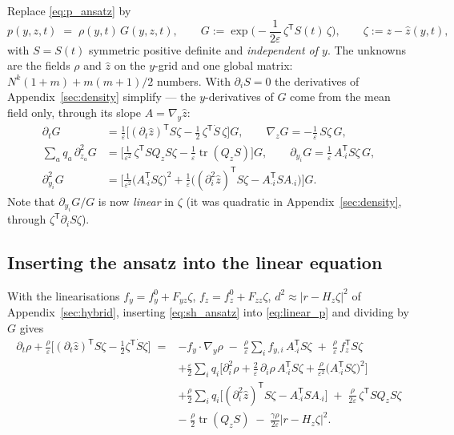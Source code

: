 \documentclass[11pt,a4paper]{article}
\newcommand{\tr}{\operatorname{tr}}
\newcommand{\T}{^{\mathsf T}}
\newcommand{\zh}{\hat{z}}
\newcommand{\eps}{\varepsilon}
\newcommand{\abs}[1]{\left\lvert #1 \right\rvert}
\newcommand{\gy}{\nabla_{\!y}}
\newcommand{\gz}{\nabla_{\!z}}
\theoremstyle{plain}
\theoremstyle{definition}
\theoremstyle{remark}
\begin{document}
Replace \eqref{eq:p_ansatz} by
\begin{equation}
  p(y,z,t) \;=\; \rho(y,t)\,G(y,z,t), \qquad
  G := \exp\Big(-\frac{1}{2\eps}\,\zeta\T S(t)\,\zeta\Big), \qquad \zeta := z-\zh(y,t),
  \label{eq:sh_ansatz}
\end{equation}
with $S=S(t)$ symmetric positive definite and \emph{independent of $y$}. The unknowns are the fields $\rho$ and $\zh$ on the $y$-grid and one global matrix: $N^k(1+m) + m(m+1)/2$ numbers. With $\partial_iS=0$ the derivatives of Appendix~\ref{sec:density} simplify --- the $y$-derivatives of $G$ come from the mean field only, through its slope $A=\gy\zh$:
\begin{align*}
  \partial_tG &= \frac1\eps\Big[(\partial_t\zh)\T S\zeta - \tfrac12\,\zeta\T\dot S\,\zeta\Big]G, \qquad
  \gz G = -\frac1\eps\,S\zeta\,G, \\
  \sum_a q_a\,\partial_{z_a}^2G &= \Big[\frac1{\eps^2}\,\zeta\T SQ_zS\zeta - \frac1\eps\tr(Q_zS)\Big]G, \qquad
  \partial_{y_i}G = \frac1\eps\,A_{\cdot i}\T S\zeta\,G, \\
  \partial_{y_i}^2G &= \Big[\frac1{\eps^2}\big(A_{\cdot i}\T S\zeta\big)^2 + \frac1\eps\Big((\partial_i^2\zh)\T S\zeta - A_{\cdot i}\T SA_{\cdot i}\Big)\Big]G .
\end{align*}
Note that $\partial_{y_i}G/G$ is now \emph{linear} in $\zeta$ (it was quadratic in Appendix~\ref{sec:density}, through $\zeta\T\partial_iS\zeta$).

\subsection{Inserting the ansatz into the linear equation}

With the linearisations $f_y = f_y^0+F_{yz}\zeta$, $f_z = f_z^0+F_{zz}\zeta$, $d^2\approx\abs{r-H_z\zeta}^2$ of Appendix~\ref{sec:hybrid}, inserting \eqref{eq:sh_ansatz} into \eqref{eq:linear_p} and dividing by $G$ gives
\begin{equation}
\begin{aligned}
  \partial_t\rho + \frac\rho\eps\Big[(\partial_t\zh)\T S\zeta - \tfrac12\zeta\T\dot S\zeta\Big]
  \;={}& -f_y\cdot\gy\rho \;-\; \frac\rho\eps\sum_i f_{y,i}\,A_{\cdot i}\T S\zeta \;+\; \frac\rho\eps\,f_z\T S\zeta \\
  &+ \frac\eps2\sum_iq_i\Big[\partial_i^2\rho + \frac2\eps\,\partial_i\rho\,A_{\cdot i}\T S\zeta
     + \frac\rho{\eps^2}\big(A_{\cdot i}\T S\zeta\big)^2\Big] \\
  &+ \frac\rho2\sum_iq_i\Big[(\partial_i^2\zh)\T S\zeta - A_{\cdot i}\T SA_{\cdot i}\Big]
  \;+\; \frac\rho{2\eps}\,\zeta\T SQ_zS\zeta \\
  &-\; \frac\rho2\tr(Q_zS) \;-\; \frac{\gamma\rho}{2\eps}\abs{r-H_z\zeta}^2 .
\end{aligned}
\label{eq:sh_inserted}
\end{equation}
\end{document}

